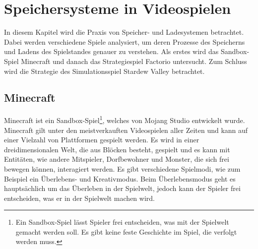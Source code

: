 \chapter{Speichersysteme in Videospielen}\label{ch:videospiele}
In diesem Kapitel wird die Praxis von Speicher- und Ladesystemen betrachtet. Dabei werden verschiedene Spiele analysiert, um deren Prozesse des Speicherns und Ladens des Spielstandes genauer zu verstehen. Als erstes wird das Sandbox-Spiel Minecraft und danach das Strategiespiel Factorio untersucht. Zum Schluss wird die Strategie des Simulationsspiel Stardew Valley betrachtet.


\section{Minecraft}
Minecraft ist ein Sandbox-Spiel\footnote{Ein Sandbox-Spiel lässt Spieler frei entscheiden, was mit der Spielwelt gemacht werden soll. Es gibt keine feste Geschichte im Spiel, die verfolgt werden muss.\cite{ocio2009multi}}, welches von Mojang Studio entwickelt wurde. Minecraft gilt unter den meistverkauften Videospielen aller Zeiten und kann auf einer Vielzahl von Plattformen gespielt werden.\cite{ignBestSellingVideo} Es wird in einer dreidimensionalen Welt, die aus Blöcken besteht, gespielt und es kann mit Entitäten, wie andere Mitspieler, Dorfbewohner und Monster, die sich frei bewegen können, interagiert werden. Es gibt verschiedene Spielmodi, wie zum Beispiel ein Überlebens- und Kreativmodus. Beim Überlebensmodus geht es hauptsächlich um das Überleben in der Spielwelt, jedoch kann der Spieler frei entscheiden, was er in der Spielwelt machen wird.\cite{minecraftWikiHome}

